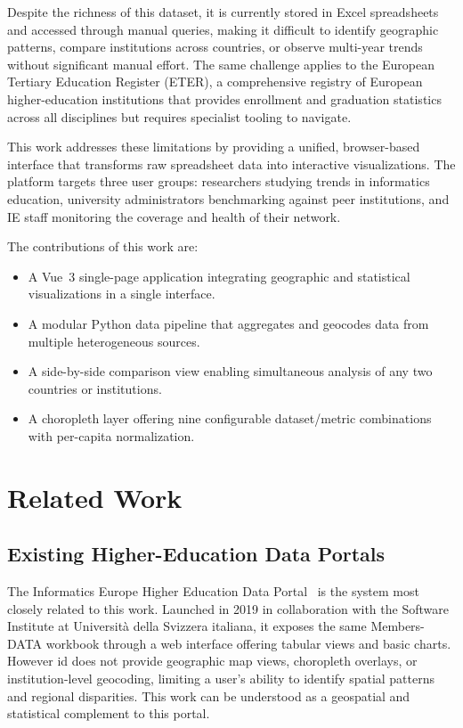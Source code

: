 \documentclass[final,3p,times,twocolumn]{elsarticle}
\begin{document}
Despite the richness of this dataset, it is currently stored in Excel spreadsheets and accessed through manual queries, making it difficult to identify geographic patterns, compare institutions across countries, or observe multi-year trends without significant manual effort. The same challenge applies to the European Tertiary Education Register (ETER), a comprehensive registry of European higher-education institutions that provides enrollment and graduation statistics across all disciplines but requires specialist tooling to navigate.

This work addresses these limitations by providing a unified, browser-based interface that transforms raw spreadsheet data into interactive visualizations. The platform targets three user groups: researchers studying trends in informatics education, university administrators benchmarking against peer institutions, and IE staff monitoring the coverage and health of their network.

The contributions of this work are:
\begin{itemize}
    \item A Vue~3 single-page application integrating geographic and statistical visualizations in a single interface.
    \item A modular Python data pipeline that aggregates and geocodes data from multiple heterogeneous sources.
    \item A side-by-side comparison view enabling simultaneous analysis of any two countries or institutions.
    \item A choropleth layer offering nine configurable dataset/metric combinations with per-capita normalization.
\end{itemize}

\section{Related Work}
\label{sec:relatedwork}

\subsection{Existing Higher-Education Data Portals}

The Informatics Europe Higher Education Data Portal~\cite{IEPortal2023} is the system most closely related to this work. Launched in 2019 in collaboration with the Software Institute at Università della Svizzera italiana, it exposes the same Members-DATA workbook through a web interface offering tabular views and basic charts. However id does not provide geographic map views, choropleth overlays, or institution-level geocoding, limiting a user's ability to identify spatial patterns and regional disparities. This work can be understood as a geospatial and statistical complement to this portal.
\end{document}
